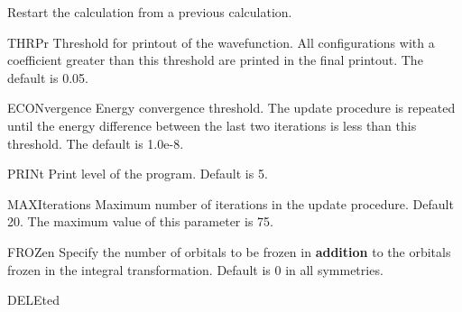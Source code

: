 \begin{keywordlist}
Restart the calculation from a previous calculation.
\item[THRPr]
Threshold for printout of the wavefunction. All configurations with
a coefficient greater than this threshold are printed in the final
printout. The default is 0.05.
\item[ECONvergence]
Energy convergence threshold. The update procedure is repeated
until the energy difference between the last two iterations is less
than this threshold. The default is 1.0e-{}8.
\item[PRINt]
Print level of the program. Default is 5.
\item[MAXIterations]
Maximum number of iterations in the update procedure. Default 20.
The maximum value of this parameter is 75.
\item[FROZen]
Specify the number of orbitals to be frozen in
{\bf addition} to the orbitals frozen in the integral transformation. Default is 0
in all symmetries.
\item[DELEted]

\end{keywordlist}
